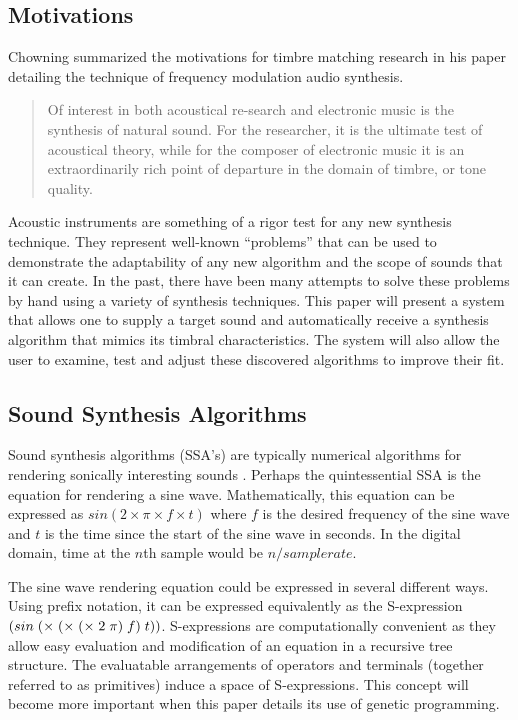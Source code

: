 \documentclass[12pt]{article}
\begin{document}
\subsection{Motivations}
Chowning summarized the motivations for timbre matching research in his paper detailing the technique of frequency modulation audio synthesis.
\begin{quote}
Of interest in both acoustical re-search and electronic music is the synthesis of natural sound. For the researcher, it is the ultimate test of acoustical theory, while for the composer of electronic music it is an extraordinarily rich point of departure in the domain of timbre, or tone quality. \citep{chowning1973synthesis}
\end{quote}
Acoustic instruments are something of a rigor test for any new synthesis technique. They represent well-known ``problems'' that can be used to demonstrate the adaptability of any new algorithm and the scope of sounds that it can create. In the past, there have been many attempts to solve these problems by hand using a variety of synthesis techniques. This paper will present a system that allows one to supply a target sound and automatically receive a synthesis algorithm that mimics its timbral characteristics. The system will also allow the user to examine, test and adjust these discovered algorithms to improve their fit.

\subsection{Sound Synthesis Algorithms}\label{SSA}
Sound synthesis algorithms (SSA's) are typically numerical algorithms for rendering sonically interesting sounds \citep{tolonen1998evaluation}. Perhaps the quintessential SSA is the equation for rendering a sine wave. Mathematically, this equation can be expressed as $sin (2 \times \pi \times f \times t)$ where $f$ is the desired frequency of the sine wave and $t$ is the time since the start of the sine wave in seconds. In the digital domain, time at the $n$th sample would be $n/sample rate$.
	
The sine wave rendering equation could be expressed in several different ways. Using prefix notation, it can be expressed equivalently as the S-expression $\sexp{({sin} (\times (\times (\times 2 \pi) f) t))}$. S-expressions are computationally convenient as they allow easy evaluation and modification of an equation in a recursive tree structure. The evaluatable arrangements of operators and terminals (together referred to as primitives) induce a space of S-expressions. This concept will become more important when this paper details its use of genetic programming.
	
\end{document}

